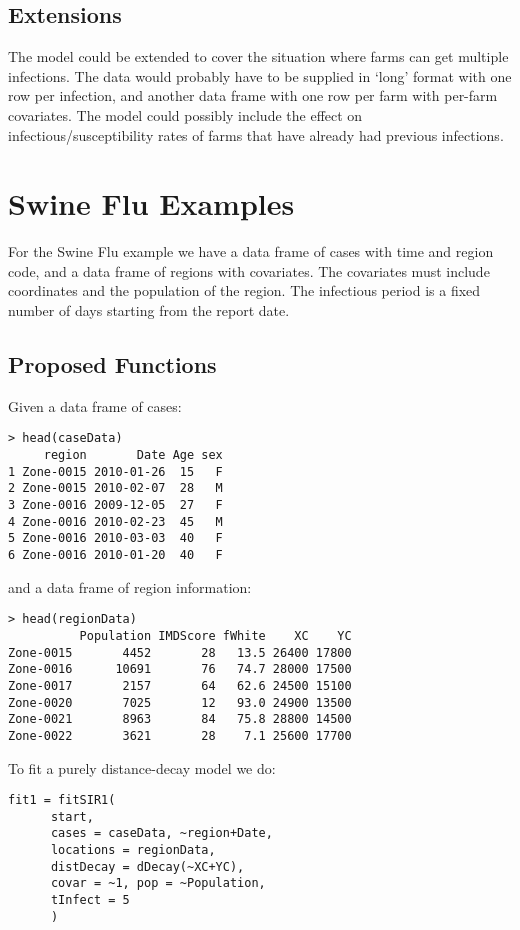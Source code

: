 \documentclass{article}
\begin{document}
\subsection*{Extensions}

The model could be extended to cover the situation where farms can get multiple infections. The data would 
probably have to be supplied in `long' format with one row per infection, and another data frame with one row per farm 
with per-farm covariates. The model could possibly include the effect on infectious/susceptibility rates of farms that
have already had previous infections.


\section*{Swine Flu Examples}

For the Swine Flu example we have a data frame of cases with time and
region code, and a data frame of regions with covariates. The
covariates must include coordinates and the population of the
region. The infectious period is a fixed number of days starting from
the report date.

\subsection*{Proposed Functions}

Given a data frame of cases:

\begin{verbatim}
> head(caseData)
     region       Date Age sex
1 Zone-0015 2010-01-26  15   F
2 Zone-0015 2010-02-07  28   M
3 Zone-0016 2009-12-05  27   F
4 Zone-0016 2010-02-23  45   M
5 Zone-0016 2010-03-03  40   F
6 Zone-0016 2010-01-20  40   F
\end{verbatim}

and a data frame of region information:

\begin{verbatim}
> head(regionData)
          Population IMDScore fWhite    XC    YC
Zone-0015       4452       28   13.5 26400 17800
Zone-0016      10691       76   74.7 28000 17500
Zone-0017       2157       64   62.6 24500 15100
Zone-0020       7025       12   93.0 24900 13500
Zone-0021       8963       84   75.8 28800 14500
Zone-0022       3621       28    7.1 25600 17700
\end{verbatim}

To fit a purely distance-decay model we do:

\begin{verbatim}
fit1 = fitSIR1(
      start,
      cases = caseData, ~region+Date,
      locations = regionData, 
      distDecay = dDecay(~XC+YC),
      covar = ~1, pop = ~Population,
      tInfect = 5
      )
\end{verbatim}
\end{document}
